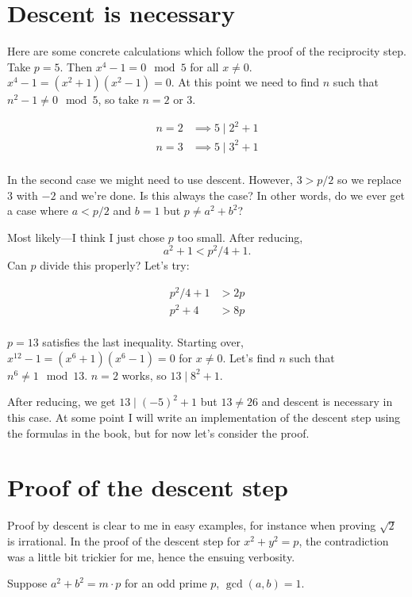 

\section{Descent is necessary}
Here are some concrete calculations which follow the proof of the reciprocity step. Take $p = 5$. Then $x^4 - 1 = 0 \mod 5$ for all $x \neq 0$. $x^4 - 1 = (x^2 + 1)(x^2 - 1) = 0$. At this point we need to find $n$ such that $n^2 - 1 \neq 0 \mod 5$, so take $n = 2$ or 3.

\begin{align*}
n = 2 &\implies 5\mid 2^2 + 1\\
n = 3 &\implies 5\mid 3^2 + 1\\
\end{align*}

In the second case we might need to use descent. However, $3 > p/2$ so we replace 3 with $-2$ and we're done. Is this always the case? In other words, do we ever get a case where $a < p/2$ and $b = 1$ but $p \neq a^2 + b^2$?

Most likely---I think I just chose $p$ too small. After reducing, \[a^2 + 1 < p^2/4 + 1.\] Can $p$ divide this properly? Let's try:

\begin{align*}
p^2/4 + 1 &> 2p\\
p^2 + 4 &> 8p\\
\end{align*}

$p = 13$ satisfies the last inequality. Starting over, $x^{12} - 1 = (x^6 + 1)(x^6 - 1) = 0$ for $x \neq 0$. Let's find $n$ such that $n^6 \neq 1 \mod 13$. $n = 2$ works, so $13\mid 8^2 + 1$.

After reducing, we get $13 \mid (-5)^2 + 1$ but $13 \neq 26$ and descent is necessary in this case. At some point I will write an implementation of the descent step using the formulas in the book, but for now let's consider the proof.

\section{Proof of the descent step}

Proof by descent is clear to me in easy examples, for instance when proving $\sqrt{2}$ is irrational. In the proof of the descent step for $x^2+y^2 = p$, the contradiction was a little bit trickier for me, hence the ensuing verbosity.

Suppose $a^2 + b^2 = m\cdot p$ for an odd prime $p$, $\gcd(a, b)=1$.

